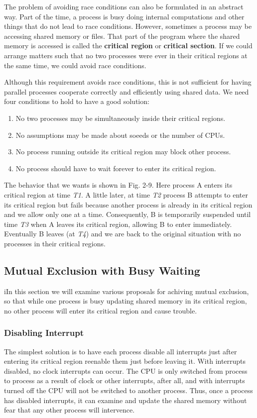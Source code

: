 \documentclass{book}
\newcommand {\kw}  [1] {\textbf{#1}}
\newcommand {\sys} [1] {\textsl{#1}}
\begin{document}
The problem of avoiding race conditions can also be formulated in an abstract way.
Part of the time, a process is busy doing internal computations and other things that do not lead to race conditions.
However, sometimes a process may be accessing shared memory or files.
That part of the program where the shared memory is accessed is called the \kw{critical region} or \kw{critical section}.
If we could arrange matters such that no two processes were ever in their critical regions at the same time, we could avoid race conditions.

Although this requirement avoids race conditions, 
this is not sufficient for having parallel processes cooperate correctly and efficiently using shared data.
We need four conditions to hold to have a good solution:
\begin{enumerate}
  \item No two processes may be simultaneously inside their critical regions.
  \item No assumptions may be made about soeeds or the number of CPUs.
  \item No process running outside its critical region may block other process.
  \item No process should have to wait forever to enter its critical region.
\end{enumerate}

The behavior that we wants is shown in Fig. 2-9.
Here process A enters its critical region at time \sys{T1}.
A little later, at time \sys{T2} process B attempts to enter its critical region but fails 
because another process is already in its critical region and we allow only one at a time.
Consequently, B is temporarily suspended until time \sys{T3} when A leaves its critical region, allowing B to enter immediately.
Eventually B leaves (at \sys{T4}) and we are back to the original situation with no processes in their critical regions.

\subsection{Mutual Exclusion with Busy Waiting}
iIn this section we will examine various proposals for achiving mutual exclusion,
so that while one process is busy updating shared memory in its critical region,
no other process will enter its critical region and cause trouble.
\subsubsection*{Disabling Interrupt}
The simplest solution is to have each process disable all interrupts just after entering its critical region 
reenable them just before leaving it.
With interrupts disabled, no clock interrupts can occur.
The CPU is only switched from process to process as a result of clock or other interrupts, after all,
and with interrupts turned off the CPU will not be switched to another process.
Thus, once a process has disabled interrupts, it can examine and update the shared memory without fear that any other process will intervence.
\end{document}
